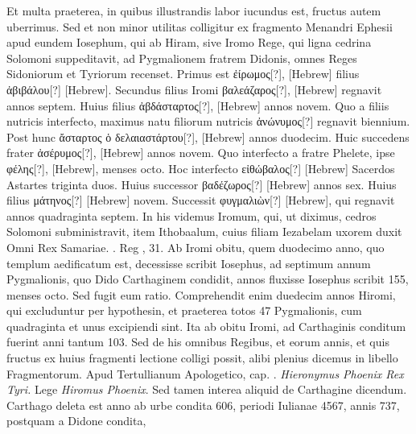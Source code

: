 Et
multa praeterea, in quibus illustrandis labor iucundus est, fructus
autem uberrimus.
Sed et non minor utilitas colligitur ex fragmento
Menandri Ephesii apud eundem Iosephum, qui ab Hiram, sive
Iromo Rege, qui ligna cedrina Solomoni suppeditavit, ad Pygmalionem
fratrem Didonis, omnes Reges Sidoniorum et Tyriorum
recenset.
Primus est \textgreek{ἐίρωμος[?]}, \texthebrew{[Hebrew]}
 filius \textgreek{ἀβιβάλου[?]} \texthebrew{[Hebrew]}.
Secundus filius Iromi \textgreek{βαλεάζαρος[?]},
 \texthebrew{[Hebrew]} regnavit annos septem.
Huius filius \textgreek{ἀβδάσταρτος[?]}, \texthebrew{[Hebrew]} annos novem.
Quo a filiis nutricis
interfecto, maximus natu filiorum nutricis \textgreek{ἀνώνυμος[?]} regnavit
biennium.
Post hunc \textgreek{ἄσταρτος ὁ δελαιαστάρτου[?]},
 \texthebrew{[Hebrew]} annos
duodecim.
Huic succedens frater \textgreek{ἀσέρυμος[?]},
 \texthebrew{[Hebrew]} annos novem.
Quo interfecto a fratre Phelete, ipse
 \textgreek{φέλης[?]}, \texthebrew{[Hebrew]}, menses octo.
Hoc interfecto \textgreek{εἰθώβαλος[?]} \texthebrew{[Hebrew]}
 Sacerdos Astartes triginta
duos.
Huius successor \textgreek{βαδέζωρος[?]}
 \texthebrew{[Hebrew]} annos sex.
Huius filius
\textgreek{μάτηνος[?]} \texthebrew{[Hebrew]} novem.
Successit \textgreek{φυγμαλιὼν[?]}
 \texthebrew{[Hebrew]}, qui regnavit
annos quadraginta septem.
In his videmus Iromum, qui, ut
diximus, cedros Solomoni subministravit, item Ithobaalum, cuius
filiam Iezabelam uxorem duxit Omni Rex Samariae. . Reg ,
31.
Ab Iromi obitu, quem duodecimo anno, quo templum aedificatum
est, decessisse scribit Iosephus, ad septimum annum Pygmalionis,
quo Dido Carthaginem condidit, annos fluxisse Iosephus
scribit 155, menses octo.
Sed fugit eum ratio.
Comprehendit
enim duedecim annos Hiromi, qui excluduntur per hypothesin,
et praeterea totos 47 Pygmalionis, cum quadraginta et
unus excipiendi sint.
Ita ab obitu Iromi, ad Carthaginis conditum
fuerint anni tantum 103.
Sed de his omnibus Regibus, et
eorum annis, et quis fructus ex huius fragmenti lectione colligi
possit, alibi plenius dicemus in libello Fragmentorum.
Apud Tertullianum Apologetico, cap. .
\textit{Hieronymus Phoenix Rex Tyri.}
Lege \textit{Hiromus Phoenix}.
Sed tamen interea aliquid de Carthagine
dicendum.
Carthago deleta est anno ab urbe condita 606,
periodi Iulianae 4567, annis 737, postquam a Didone condita,
